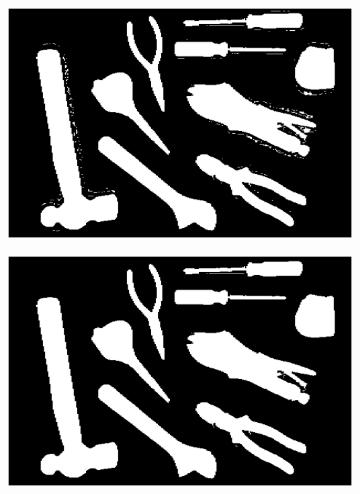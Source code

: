 \documentclass[a4paper, 11pt]{article}
\begin{document}
\begin{figure}[h]
  \centering
  \begin{subfigure}{0.45\linewidth}
    \includegraphics[width=\linewidth]{paso5} 
    \caption{}
    \label{fig:1a}
  \end{subfigure}\hfill
  \begin{subfigure}{0.45\linewidth}
    \includegraphics[width=\linewidth]{paso6}
    \caption{}
    \label{fig:1a}
  \end{subfigure}
  

\end{figure}
\end{document}
